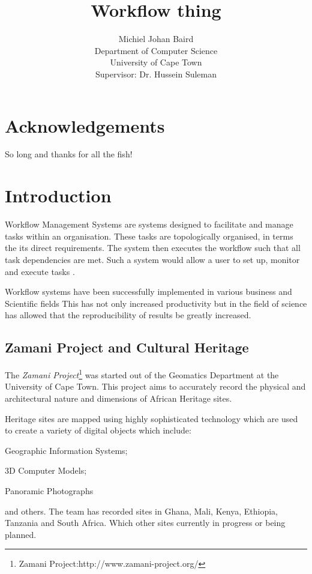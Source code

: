 \documentclass[12pt,a4paper]{report}
\title{Workflow thing}
\author{Michiel Johan Baird \\
        Department of Computer Science \\
        University of Cape Town
    \\   \small{Supervisor: Dr. Hussein Suleman} }
\begin{document}

\tableofcontents
\newpage
\listoffigures
\newpage
\begin{abstract}

\end{abstract}
\chapter*{Acknowledgements}
So long and thanks for all the fish!
\chapter{Introduction}
    Workflow Management Systems are systems designed to facilitate and manage
    tasks within an organisation. These tasks are topologically organised, in
    terms the its direct requirements. The system then executes the workflow
    such that all task dependencies are met. Such a system would allow a user to
    set up, monitor and execute tasks \cite{slot2005workflow}.

    Workflow systems have been successfully implemented in various
    business and Scientific fields \cite{Brahe:2007:SWW:1316624.1316661}
    This has not only increased productivity but in the field of
    science has allowed that the reproducibility of results be greatly
    increased\cite{4721191}.




\section{Zamani Project and Cultural Heritage}
    The \emph{Zamani Project}\footnote{Zamani Project:http://www.zamani-project.org/}
    was started out of the Geomatics Department at the University of Cape Town.
    This project aims to accurately record the physical and architectural nature
    and dimensions of African Heritage sites.

    Heritage sites are mapped using highly sophisticated technology which are
    used to create a variety of digital objects which include:
    \begin{inparaenum}[i)] \item Geographic Information Systems; \item 3D
    Computer Models; \item Panoramic Photographs\end{inparaenum} and others.
    The team has recorded sites in Ghana, Mali, Kenya, Ethiopia, Tanzania and
    South Africa. Which other sites currently in progress or being planned.
\end{document}
